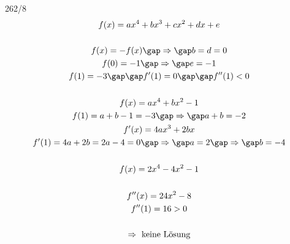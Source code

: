 \begin{exercise}{262/8}
  \begin{gather*}
    f(x) = ax^4 + bx^3 + cx^2 + dx + e \\\\
    f(x) = -f(x) \gap\Rightarrow\gap b = d = 0 \\
    f(0) = -1 \gap\Rightarrow\gap e = -1 \\
    f(1) = -3 \gap\gap f'(1) = 0 \gap\gap f''(1) < 0 \\\\
    f(x) = ax^4 + bx^2 - 1 \\
    f(1) = a + b - 1 = -3 \gap\Rightarrow\gap a + b = -2 \\
    f'(x) = 4ax^3 + 2bx \\
    f'(1) = 4a + 2b = 2a - 4 = 0 \gap\Rightarrow\gap a = 2 \gap\Rightarrow\gap b = -4 \\\\
    f(x) = 2x^4 - 4x^2 - 1 \\\\
    f''(x) = 24x^2 - 8 \\
    f''(1) = 16 > 0 \\\\
    \Rightarrow\text{ keine Lösung}
  \end{gather*}
\end{exercise}
\newpage
